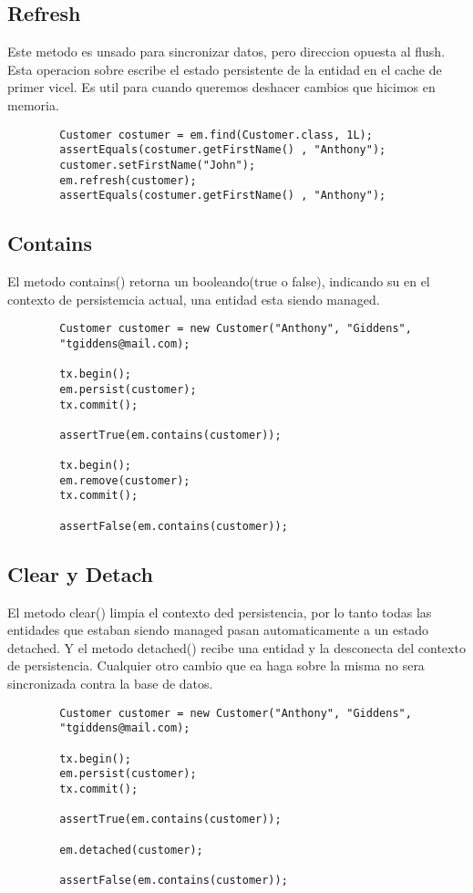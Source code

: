 \documentclass{article}
\begin{document}
\subsection*{Refresh}
Este metodo es unsado para sincronizar datos, pero direccion opuesta al flush. Esta operacion sobre escribe el estado persistente de la entidad en el cache de primer vicel. Es util para cuando queremos deshacer cambios que hicimos en
memoria.
\begin{lstlisting}
        Customer costumer = em.find(Customer.class, 1L);
        assertEquals(costumer.getFirstName() , "Anthony");
        customer.setFirstName("John");
        em.refresh(customer);
        assertEquals(costumer.getFirstName() , "Anthony");
    \end{lstlisting}
\subsection*{Contains}

El metodo contains() retorna un booleando(true o false), indicando su en el contexto de persistemcia actual, una entidad esta siendo managed.
\begin{lstlisting}
        Customer customer = new Customer("Anthony", "Giddens", 
        "tgiddens@mail.com);

        tx.begin();
        em.persist(customer);
        tx.commit();

        assertTrue(em.contains(customer));

        tx.begin();
        em.remove(customer);
        tx.commit();

        assertFalse(em.contains(customer));
    \end{lstlisting}

\subsection*{Clear y Detach}

El metodo clear() limpia el contexto ded persistencia, por lo tanto todas las entidades que estaban siendo managed pasan automaticamente a un estado detached. Y el metodo detached() recibe una entidad
y la desconecta del contexto de persistencia. Cualquier otro cambio que ea haga sobre la misma no sera sincronizada contra la base de datos.

\begin{lstlisting}
        Customer customer = new Customer("Anthony", "Giddens", 
        "tgiddens@mail.com);

        tx.begin();
        em.persist(customer);
        tx.commit();

        assertTrue(em.contains(customer));

        em.detached(customer);

        assertFalse(em.contains(customer));

    \end{lstlisting}
\end{document}
